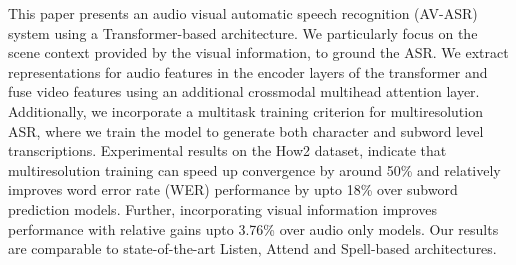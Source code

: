 This paper presents an audio visual automatic speech recognition (AV-ASR) system using a Transformer-based architecture. We particularly focus on the scene context provided by the visual information, to ground the ASR. We extract representations for audio features in the encoder layers of the transformer and fuse video features using an additional crossmodal multihead attention layer. Additionally, we incorporate a multitask training criterion for multiresolution ASR, where we train the model to generate both character and subword level transcriptions. Experimental results on the How2 dataset, indicate that multiresolution training can speed up convergence by around 50\% and relatively improves  word error rate (WER) performance by upto 18\% over subword prediction models. Further, incorporating visual information improves performance with relative gains upto 3.76\% over audio only models. Our results are comparable to state-of-the-art Listen, Attend and Spell-based architectures.
